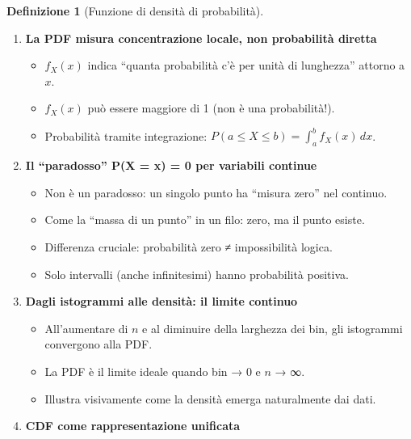 \documentclass[
  italian,
  letterpaper,
  a4paper,
  11pt,
  open=any]{scrbook}
\providecommand{\tightlist}{%
  \setlength{\itemsep}{0pt}\setlength{\parskip}{0pt}}
\theoremstyle{plain}
\theoremstyle{definition}
\theoremstyle{definition}
\newtheorem{definition}{Definizione}[chapter]
\theoremstyle{remark}
\begin{document}
\begin{definition}[Funzione di densità di
probabilità]
\begin{tcolorbox}
\begin{enumerate}
  \begin{itemize}
  \tightlist
  \item
    \(p_X(x) = P(X = x)\) è la probabilità \emph{del} punto \(x\).
  \item
    Diagramma a barre: l'altezza rappresenta direttamente la
    probabilità.
  \item
    Somma delle probabilità: \(\sum_x p_X(x) = 1\).
  \end{itemize}
\item
  \textbf{La PDF misura concentrazione locale, non probabilità diretta}

  \begin{itemize}
  \tightlist
  \item
    \(f_X(x)\) indica ``quanta probabilità c'è per unità di lunghezza''
    attorno a \(x\).
  \item
    \(f_X(x)\) può essere maggiore di 1 (non è una probabilità!).
  \item
    Probabilità tramite integrazione:
    \(P(a \leq X \leq b) = \int_a^b f_X(x) \, dx\).
  \end{itemize}
\item
  \textbf{Il ``paradosso'' P(X = x) = 0 per variabili continue}

  \begin{itemize}
  \tightlist
  \item
    Non è un paradosso: un singolo punto ha ``misura zero'' nel
    continuo.
  \item
    Come la ``massa di un punto'' in un filo: zero, ma il punto esiste.
  \item
    Differenza cruciale: probabilità zero ≠ impossibilità logica.
  \item
    Solo intervalli (anche infinitesimi) hanno probabilità positiva.
  \end{itemize}
\item
  \textbf{Dagli istogrammi alle densità: il limite continuo}

  \begin{itemize}
  \tightlist
  \item
    All'aumentare di \(n\) e al diminuire della larghezza dei bin, gli
    istogrammi convergono alla PDF.
  \item
    La PDF è il limite ideale quando bin → 0 e \(n\) → ∞.
  \item
    Illustra visivamente come la densità emerga naturalmente dai dati.
  \end{itemize}
\item
  \textbf{CDF come rappresentazione unificata}


\end{enumerate}
\end{tcolorbox}
\end{definition}
\end{document}
